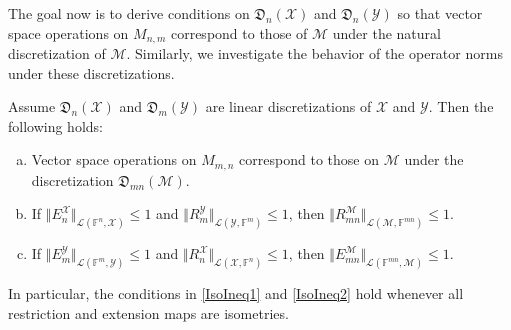 \documentclass[a4paper]{paper}
\newcommand{\discr}{\mathfrak{D}}
\newcommand{\VecSpace}[1]{\mathscr{#1}}
\newcommand{\Field}{\mathbb{F}}
\begin{document}
The goal now is to derive conditions on $\discr_{n}(\VecSpace{X})$ and $\discr_{n}(\VecSpace{Y})$ so that
vector space operations on $M_{n,m}$ correspond to those of $\VecSpace{M}$ under the natural discretization of $\VecSpace{M}$.
Similarly, we investigate the behavior of the operator norms under these discretizations.
\begin{theorem}
Assume $\discr_{n}(\VecSpace{X})$ and $ \discr_{m}(\VecSpace{Y})$ are linear discretizations of 
$\VecSpace{X}$ and $\VecSpace{Y}$. Then the following holds:
\begin{enumerate}[(a)]
\item Vector space operations on $M_{m,n}$ correspond to those on 
$\VecSpace{M}$ under the discretization $\discr_{m n}(\VecSpace{M})$.
\item If 
  $\Vert E_{n}^{\VecSpace{X}} \Vert_{\VecSpace{L}(\Field^n, \VecSpace{X})} \leq 1$
  and 
 $\Vert R_{m}^{\VecSpace{Y}} \Vert_{\VecSpace{L}(\VecSpace{Y},\Field^m)} \leq 1$,
 then $\Vert R_{m n}^{\VecSpace{M}} \Vert_{\VecSpace{L}(\VecSpace{M},\Field^{mn})} \leq 1$.%
 \label{IsoIneq1}%
\item If 
  $\Vert E_{m}^{\VecSpace{Y}} \Vert_{\VecSpace{L}(\Field^m, \VecSpace{Y})} \leq 1$ 
  and
  $\Vert R_{n}^{\VecSpace{X}} \Vert_{\VecSpace{L}(\VecSpace{X},\Field^n)} \leq 1$, 
  then $\Vert E_{m n}^{\VecSpace{M}} \Vert_{\VecSpace{L}(\Field^{mn}, \VecSpace{M})} \leq 1$.%
  \label{IsoIneq2}%
\end{enumerate}
In particular, the conditions in \eqref{IsoIneq1} and \eqref{IsoIneq2} hold whenever all restriction and extension maps 
are isometries.
\end{theorem}
\end{document}
